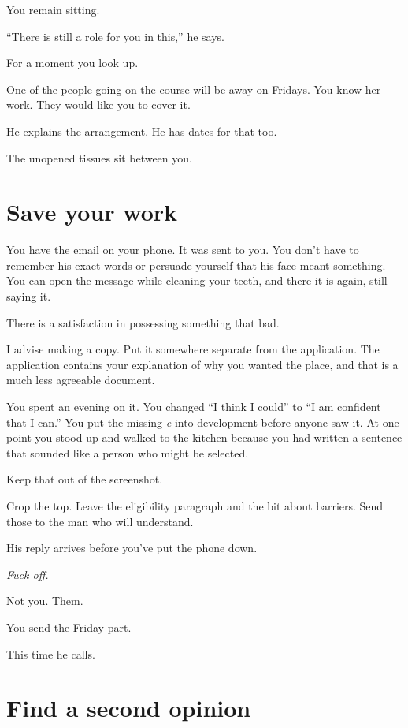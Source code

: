 \documentclass[11pt,oneside]{book}
\begin{document}
You remain sitting.

``There is still a role for you in this,'' he says.

For a moment you look up.

One of the people going on the course will be away on Fridays. You know her work. They would like you to cover it.

He explains the arrangement. He has dates for that too.

The unopened tissues sit between you.

\section*{Save your work}

You have the email on your phone. It was sent to you. You don't have to remember his exact words or persuade yourself that his face meant something. You can open the message while cleaning your teeth, and there it is again, still saying it.

There is a satisfaction in possessing something that bad.

I advise making a copy. Put it somewhere separate from the application. The application contains your explanation of why you wanted the place, and that is a much less agreeable document.

You spent an evening on it. You changed ``I think I could'' to ``I am confident that I can.'' You put the missing \emph{e} into development before anyone saw it. At one point you stood up and walked to the kitchen because you had written a sentence that sounded like a person who might be selected.

Keep that out of the screenshot.

Crop the top. Leave the eligibility paragraph and the bit about barriers. Send those to the man who will understand.

His reply arrives before you've put the phone down.

\emph{Fuck off.}

Not you. Them.

You send the Friday part.

This time he calls.

\section*{Find a second opinion}
\end{document}
